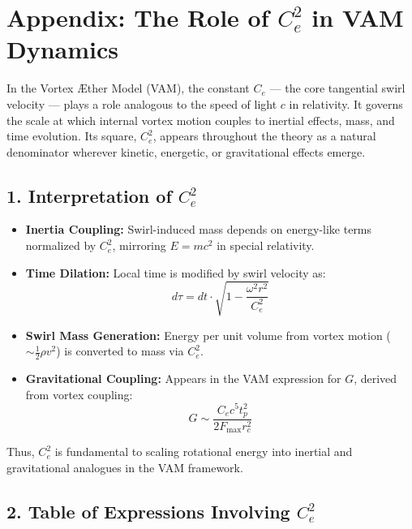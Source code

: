 \documentclass[11pt]{article}
\begin{document}
\section*{Appendix: The Role of \( C_e^2 \) in VAM Dynamics}

In the Vortex Æther Model (VAM), the constant \( C_e \) --- the core tangential swirl velocity --- plays a role analogous to the speed of light \( c \) in relativity. It governs the scale at which internal vortex motion couples to inertial effects, mass, and time evolution. Its square, \( C_e^2 \), appears throughout the theory as a natural denominator wherever kinetic, energetic, or gravitational effects emerge.

\subsection*{1. Interpretation of \( C_e^2 \)}

\begin{itemize}
    \item \textbf{Inertia Coupling:} Swirl-induced mass depends on energy-like terms normalized by \( C_e^2 \), mirroring \( E = mc^2 \) in special relativity.
    \item \textbf{Time Dilation:} Local time is modified by swirl velocity as:
    \[ d\tau = dt \cdot \sqrt{1 - \frac{\omega^2 r^2}{C_e^2}} \]

    \item \textbf{Swirl Mass Generation:} Energy per unit volume from vortex motion (\( \sim \frac{1}{2} \rho v^2 \)) is converted to mass via \( C_e^2 \).

    \item \textbf{Gravitational Coupling:} Appears in the VAM expression for \( G \), derived from vortex coupling:
    \[ G \sim \frac{C_e c^5 t_p^2}{2 F_{\text{max}} r_c^2} \]
\end{itemize}

Thus, \( C_e^2 \) is fundamental to scaling rotational energy into inertial and gravitational analogues in the VAM framework.

\subsection*{2. Table of Expressions Involving \( C_e^2 \)}
\end{document}
